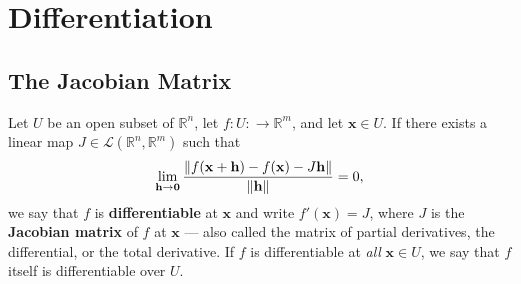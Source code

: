 \documentclass[11pt]{article}
\renewcommand{\vec}[1]{\mathbf{#1}}
\begin{document}

\section{Differentiation}

\subsection{The Jacobian Matrix}

Let $U$ be an open subset of $\mathbb{R}^{n}$, let $f: U : \to \mathbb{R}^{m}$, and let $\vec{x} \in U$. If there exists a linear map $J \in \mathcal{L}(\mathbb{R}^{n}, \mathbb{R}^{m})$ such that 
\[
	\lim\limits_{\vec{h} \to \vec{0}} \frac{\norm{f(\vec{x} + \vec{h}) - f(\vec{x}) - J\vec{h}}}{\norm{\vec{h}}} = 0,
\] 
we say that $f$ is \textbf{differentiable} at $\vec{x}$ and write $f'(\vec{x}) = J$, where $J$ is the \textbf{Jacobian matrix} of $f$ at $\vec{x}$ --- also called the matrix of partial derivatives, the differential, or the total derivative. If $f$ is differentiable at \textit{all} $\vec{x} \in U$, we say that $f$ itself is differentiable over $U$.
\end{document}
